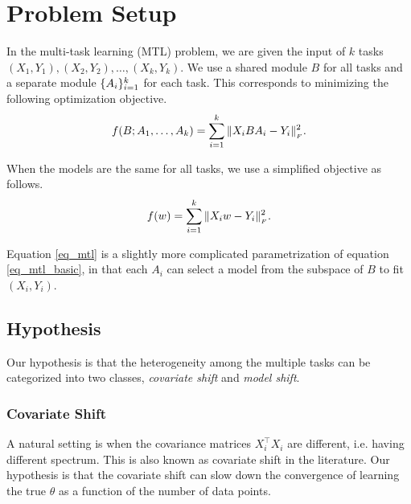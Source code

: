 \section{Problem Setup}\label{sec_setup}

In the multi-task learning (MTL) problem, we are given the input of $k$ tasks $(X_1, Y_1), (X_2, Y_2), \dots, (X_k, Y_k)$.
We use a shared module $B$ for all tasks and a separate module $\{A_i\}_{i=1}^k$ for each task.
This corresponds to minimizing the following optimization objective.
\begin{align}
	\label{eq_mtl}
	f(B; A_1, \dots, A_k) = \sum_{i=1}^k \|X_i B A_i - Y_i\|_{_{F}}^2.
\end{align}

When the models are the same for all tasks, we use a simplified objective as follows.
\begin{align}
	\label{eq_mtl_basic}
	f(w) = \sum_{i=1}^k \|X_i w - Y_i\|_{_{F}}^2.
\end{align}

Equation \eqref{eq_mtl} is a slightly more complicated parametrization of equation \eqref{eq_mtl_basic}, in that each $A_i$ can select a model from the subspace of $B$ to fit $(X_i, Y_i)$.


\subsection{Hypothesis}

Our hypothesis is that the heterogeneity among the multiple tasks can be categorized into two classes, \textit{covariate shift} and \textit{model shift}. %

\subsubsection{Covariate Shift}

A natural setting is when the covariance matrices $X_i^{\top} X_i$ are different, i.e. having different spectrum.
This is also known as covariate shift in the literature.
Our hypothesis is that the covariate shift can slow down the convergence of learning the true $\theta$ as a function of the number of data points.


